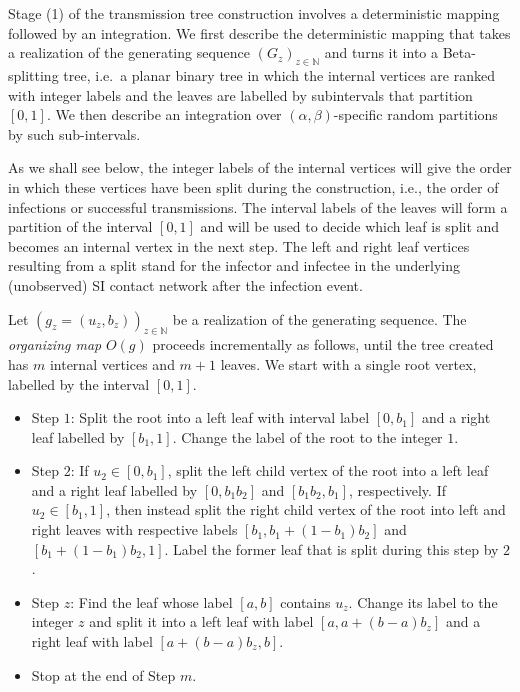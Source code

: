 \documentclass[review]{elsarticle}
\numberwithin{equation}{section}
\newcommand{\bN}{{\mathbb N}}
\begin{document}
Stage (1) of the transmission tree construction involves a deterministic mapping followed by an integration.  
We first describe the deterministic mapping that takes a realization of the generating sequence $(G_z)_{z\in \bN}$ and turns it into a Beta-splitting tree, i.e.~a planar binary tree in which the internal vertices are ranked with integer labels and the leaves are labelled by subintervals that partition $[0,1]$. 
We then describe an integration over $(\alpha,\beta)$-specific random partitions by such sub-intervals.  

As we shall see below, the integer labels of the internal vertices will give the order in which these vertices have been split during the construction, i.e., the order of infections or successful transmissions.  
The interval labels of the leaves will form a partition of the interval $[0,1]$ and will be used to decide which leaf is split and becomes an internal vertex in the next step.  
The left and right leaf vertices resulting from a split stand for the infector and infectee in the underlying (unobserved) SI contact network after the infection event.

Let $(g_z=(u_z,b_z))_{z\in \bN}$ be a realization of the generating sequence. 
The {\em organizing map} $O(g)$ proceeds incrementally as follows, until the tree created has $m$ internal vertices and $m+1$ leaves.  
We start with a single root vertex, labelled by the interval $[0,1]$. 
\begin{itemize}
\item Step $1$: Split the root into a left leaf with interval label $[0,b_1]$ and a right leaf labelled by $[b_1,1]$.  Change the label of the root to the integer $1$.
\item Step $2$: If $u_2\in [0,b_1]$, split the left child vertex of the root into a left leaf and a right leaf labelled by $[0,b_1b_2]$ and $[b_1b_2,b_1]$, respectively.  If $u_2\in [b_1,1]$, then instead split the right child vertex of the root into left and right leaves with respective labels $[b_1,b_1+(1-b_1)b_2]$ and $[b_1+(1-b_1)b_2,1]$.  Label the former leaf that is split during this step by $2$.
\item Step $z$: Find the leaf whose label $[a,b]$ contains $u_z$.  
Change its label to the integer $z$ and split it into a left leaf with label $[a,a+(b-a)b_z]$ and a right leaf with label $[a+(b-a)b_z,b]$. 
\item Stop at the end of Step $m$.
\end{itemize}
\end{document}
